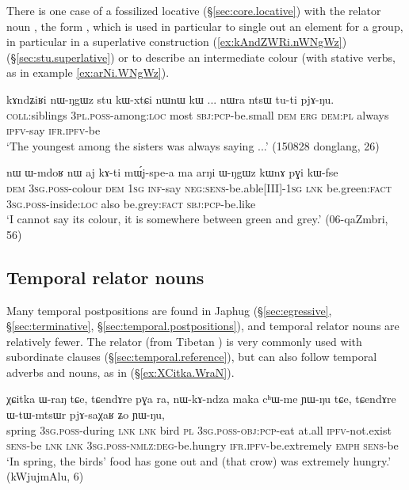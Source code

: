 There is one case of a fossilized  locative (§\ref{sec:core.locative}) with the relator noun , the form , which is used in particular to single out an element for a group, in particular in a superlative construction (\ref{ex:kAndZWRi.nWNgWz}) (§\ref{sec:stu.superlative}) or to describe an intermediate colour (with stative verbs, as in example \ref{ex:arNi.WNgWz}).

\begin{exe}
\ex \label{ex:kAndZWRi.nWNgWz} 
\gll kɤndʑiʁi nɯ-ŋgɯz stu kɯ-xtɕi nɯnɯ kɯ ... nɯra ntsɯ tu-ti pjɤ-ŋu. \\
\textsc{coll}:siblings \textsc{3pl}.\textsc{poss}-among:\textsc{loc} most \textsc{sbj}:\textsc{pcp}-be.small \textsc{dem} \textsc{erg} { } \textsc{dem}:\textsc{pl} always \textsc{ipfv}-say \textsc{ifr}.\textsc{ipfv}-be \\
\glt `The youngest among the sisters was always saying ...' (150828 donglang, 26)
  \end{exe}
  
  \begin{exe}
\ex \label{ex:arNi.WNgWz} 
\gll nɯ ɯ-mdoʁ nɯ aj kɤ-ti mɯ́j-spe-a ma arŋi ɯ-ŋgɯz kɯnɤ pɣi kɯ-fse   \\
\textsc{dem} \textsc{3sg}.\textsc{poss}-colour \textsc{dem} \textsc{1sg} \textsc{inf}-say \textsc{neg}:\textsc{sens}-be.able[III]-\textsc{1sg} \textsc{lnk} be.green:\textsc{fact} \textsc{3sg}.\textsc{poss}-inside:\textsc{loc} also be.grey:\textsc{fact} \textsc{sbj}:\textsc{pcp}-be.like \\
\glt `I cannot say its colour, it is somewhere between green and grey.' (06-qaZmbri, 56)
    \end{exe}
    
 
 \subsection{Temporal relator nouns} \label{sec:relator.temporal}
Many temporal postpositions are found in Japhug (§\ref{sec:egressive}, §\ref{sec:terminative}, §\ref{sec:temporal.postpositions}), and temporal relator nouns are relatively fewer. The relator   (from Tibetan ) is very commonly used with subordinate clauses (§\ref{sec:temporal.reference}), but can also follow temporal adverbs and nouns, as in (§\ref{ex:XCitka.WraN}).
 
   \begin{exe}
\ex \label{ex:XCitka.WraN} 
\gll χɕitka ɯ-raŋ tɕe, tɕendɤre pɣa ra, nɯ-kɤ-ndza maka cʰɯ-me ɲɯ-ŋu tɕe, tɕendɤre ɯ-tɯ-mtsɯr pjɤ-saχaʁ ʑo ɲɯ-ŋu,  \\
spring \textsc{3sg}.\textsc{poss}-during \textsc{lnk} \textsc{lnk} bird \textsc{pl} \textsc{3sg}.\textsc{poss}-\textsc{obj}:\textsc{pcp}-eat at.all \textsc{ipfv}-not.exist \textsc{sens}-be \textsc{lnk} \textsc{lnk} \textsc{3sg}.\textsc{poss}-\textsc{nmlz}:\textsc{deg}-be.hungry \textsc{ifr}.\textsc{ipfv}-be.extremely \textsc{emph} \textsc{sens}-be \\
\glt `In spring, the birds' food has gone out and (that crow) was extremely hungry.' (kWjujmAlu, 6)
\end{exe}

